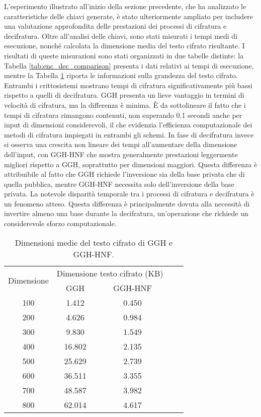 L'esperimento illustrato all'inizio della sezione precedente, che ha analizzato le 
caratteristiche delle chiavi generate, è stato ulteriormente ampliato per includere una 
valutazione approfondita delle prestazioni dei processi di cifratura e decifratura. 
Oltre all'analisi delle chiavi, sono stati misurati i tempi medi di esecuzione, 
nonché calcolata la dimensione media del testo cifrato risultante. 
I risultati di queste misurazioni sono stati organizzati in due 
tabelle distinte: la Tabella \ref{tab:enc_dec_comparison} presenta i dati relativi ai 
tempi di esecuzione, mentre la Tabella \ref{tab:ciphertext_size_comparison} riporta le 
informazioni sulla grandezza del testo cifrato. 
Entrambi i crittosistemi mostrano tempi di cifratura significativamente più bassi rispetto
a quelli di decifratura. GGH presenta un lieve vantaggio in termini di velocità di 
cifratura, ma la differenza è minima. È da sottolineare il fatto che i tempi di cifratura 
rimangono contenuti, non superando 0.1 secondi anche per input di dimensioni considerevoli, il 
che evidenzia l'efficienza computazionale dei metodi di cifratura impiegati in entrambi gli schemi.
In fase di decifratura invece si osserva una crescita non lineare dei tempi all'aumentare 
della dimensione dell'input, con GGH-HNF che mostra generalmente prestazioni leggermente 
migliori rispetto a GGH, soprattutto per dimensioni maggiori. 
Questa differenza è attribuibile al fatto che GGH richiede l'inversione sia della base privata 
che di quella pubblica, mentre GGH-HNF necessita solo dell'inversione della base privata.
La notevole disparità temporale tra i processi di cifratura e decifratura è un fenomeno atteso. 
Questa differenza è principalmente dovuta alla necessità di invertire almeno una base durante 
la decifratura, un'operazione che richiede un considerevole sforzo computazionale. 

\begin{table}[htbp]
    \centering
    \begin{tabular}{|c|c|c|c|c|}
        \hline
        \multirow{2}{*}{Dimensione} & 
        \multicolumn{2}{c|}{Dimensione testo cifrato (KB)} \\
        \cline{2-3}
        & GGH & GGH-HNF\\
        \hline
        100 & 1.412  & 0.450  \\ 
        200 & 4.626  & 0.984  \\
        300 & 9.830  & 1.549  \\
        400 & 16.802 & 2.135 \\
        500 & 25.629 & 2.739  \\
        600 & 36.511 & 3.355  \\
        700 & 48.587 & 3.982  \\
        800 & 62.014 & 4.617  \\
        \hline
    \end{tabular}
    \caption{Dimensioni medie del testo cifrato di GGH e GGH-HNF.}
    \label{tab:ciphertext_size_comparison}
\end{table}

